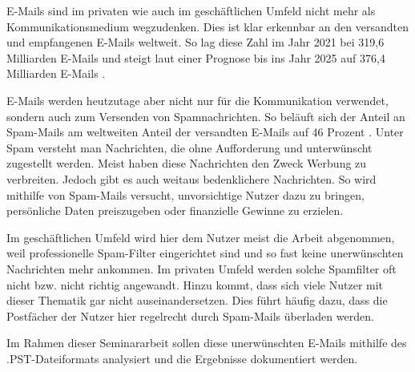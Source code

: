 E-Mails sind im privaten wie auch im geschäftlichen Umfeld nicht mehr als Kommunikationsmedium wegzudenken. Dies ist klar erkennbar an den versandten und empfangenen E-Mails weltweit. So lag diese Zahl im Jahr 2021 bei 319,6 Milliarden E-Mails und steigt laut einer Prognose bis ins Jahr 2025 auf 376,4 Milliarden E-Mails \cite{Statista.26.06.2022}. 

E-Mails werden heutzutage aber nicht nur für die Kommunikation verwendet, sondern auch zum Versenden von Spamnachrichten. So beläuft sich der Anteil an Spam-Mails am weltweiten Anteil der versandten E-Mails auf 46 Prozent \cite{ASITZentrumfursichereInformationstechnologieAustria.26.06.2022}. Unter Spam versteht man Nachrichten, die ohne Aufforderung und unterwünscht zugestellt werden. Meist haben diese Nachrichten den Zweck Werbung zu verbreiten. Jedoch gibt es auch weitaus bedenklichere Nachrichten. So wird mithilfe von Spam-Mails versucht, unvorsichtige Nutzer dazu zu bringen, persönliche Daten preiszugeben oder finanzielle Gewinne zu erzielen. 

Im geschäftlichen Umfeld wird hier dem Nutzer meist die Arbeit abgenommen, weil professionelle Spam-Filter eingerichtet sind und so fast keine unerwünschten Nachrichten mehr ankommen. Im privaten Umfeld werden solche Spamfilter oft nicht bzw. nicht richtig angewandt. Hinzu kommt, dass sich viele Nutzer mit dieser Thematik gar nicht auseinandersetzen. Dies führt häufig dazu, dass die Postfächer der Nutzer hier regelrecht durch Spam-Mails überladen werden. 

Im Rahmen dieser Seminararbeit sollen diese unerwünschten E-Mails mithilfe des .PST-Dateiformats analysiert und die Ergebnisse dokumentiert werden.
\newpage